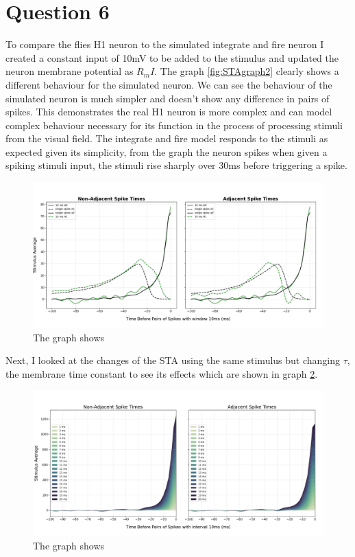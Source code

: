 \documentclass[11pt]{article}
\begin{document}
\section*{Question 6} \label{question 6}
To compare the flies H1 neuron to the simulated integrate and fire neuron I created a constant input of 10mV to be added to the stimulus and updated the neuron membrane potential as $R_mI$. The graph \ref{fig:STAgraph2} clearly shows a different behaviour for the simulated neuron. We can see the behaviour of the simulated neuron is much simpler and doesn't show any difference in pairs of spikes. This demonstrates the real H1 neuron is more complex and can model complex behaviour necessary for its function in the process of processing stimuli from the visual field. The integrate and fire model responds to the stimuli as expected given its simplicity, from the graph the neuron spikes when given a spiking stimuli input, the stimuli rise sharply over 30ms before triggering a spike.

\begin{figure}[H]
    \centering
    \includegraphics[width=1.0\linewidth]{Figure_STA_IaF.png}
    \captionsetup{font=small}
    \caption{The graph shows}
    \label{fig:STAgraph3}
\end{figure}

Next, I looked at the changes of the STA using the same stimulus but changing $\tau$, the membrane time constant to see its effects which are shown in graph \ref{fig:STAgraph3}.

\begin{figure}[H]
    \centering
    \includegraphics[width=0.99\linewidth]{Figure_tau_dependency.png}
    \caption{The graph shows}
    \label{fig:STAgraph3}
\end{figure}
\end{document}
